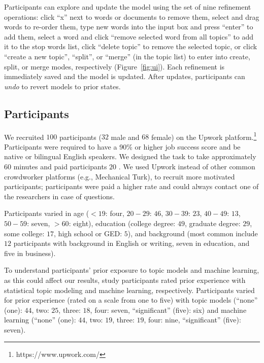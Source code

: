 Participants can explore and update the model using the set of nine
refinement operations:
click ``x'' next to words or documents to remove them, select and drag
words to re-order them, type new words into the input box and press
``enter'' to add them, select a word and click ``remove selected word
from all topics'' to add it to the stop words list, click ``delete
topic'' to remove the selected topic, or click ``create a new topic'',
``split'', or ``merge'' (in the topic list) to enter into create,
split, or merge modes, respectively (Figure~\ref{fig:ui}).
Each refinement is immediately saved and the model is updated. After
updates, participants can \textit{undo} to revert models to prior states.

\subsection{Participants}
We recruited $100$ participants ($32$ male and $68$ female) on the
Upwork platform.\footnote{https://www.upwork.com/} Participants were
  required to have a 90\% or higher job success score and be native or
  bilingual English speakers. 
  We designed the task to take approximately 60 minutes and paid participants $20$ . We used Upwork instead of other common crowdworker platforms (e.g., Mechanical Turk), to recruit more motivated participants; participants were paid a higher rate and could always contact one of the researchers in case of questions. 
  
Participants varied in age ($<19$: four, $20-29$: $46$, $30-39$: $23$, $40-49$: $13$, $50-59$: seven, $>60$: eight), education (college degree: $49$, graduate degree: $29$, some college: $17$, high school or GED: $5$), and
background (most common include $12$ participants with background in
English or writing, seven in education, and five in business). 

To understand participants' prior exposure to topic models and machine learning, as this could affect our results, study participants rated prior experience with statistical topic modeling and machine learning, respectively.
Participants varied for prior
experience (rated on a scale from one to five) with topic models (``none'' (one): $44$, two: $25$, three: $18$, four: seven, ``significant'' (five): six) and machine learning (``none'' (one): $44$, two: $19$, three: $19$, four: nine, ``significant'' (five): seven). 


